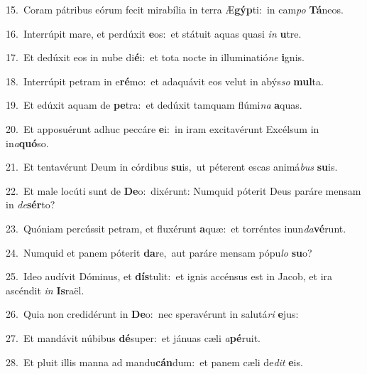 {\numbfont\textcolor{\numbcolor}{15.}}~Coram pátribus eórum fecit mirabília in terra Æ\-\textbf{gýp}\-ti:~\star in cam\textit{po} \textbf{Tá}\-neos.\par
{\numbfont\textcolor{\numbcolor}{16.}}~Interrúpit mare, et perdúxit \textbf{e}\-os:~\star et státuit aquas quasi \textit{in} \textbf{u}\-tre.\par
{\numbfont\textcolor{\numbcolor}{17.}}~Et dedúxit eos in nube di\-\textbf{é}\-i:~\star et tota nocte in illuminatió\textit{ne} \textbf{i}\-gnis.\par
{\numbfont\textcolor{\numbcolor}{18.}}~Interrúpit petram in e\-\textbf{ré}\-mo:~\star et adaquávit eos velut in abýs\textit{so} \textbf{mul}\-ta.\par
{\numbfont\textcolor{\numbcolor}{19.}}~Et edúxit aquam de \textbf{pe}\-tra:~\star et dedúxit tamquam flúmi\textit{na} \textbf{a}\-quas.\par
{\numbfont\textcolor{\numbcolor}{20.}}~Et apposuérunt adhuc peccáre \textbf{e}\-i:~\star in iram excitavérunt Excélsum in in\-\textit{a}\-\textbf{quó}so.\par
{\numbfont\textcolor{\numbcolor}{21.}}~Et tentavérunt Deum in córdibus \textbf{su}\-is,~\star ut péterent escas animá\textit{bus} \textbf{su}\-is.\par
{\numbfont\textcolor{\numbcolor}{22.}}~Et male locúti sunt de \textbf{De}\-o:~\star dixérunt: Numquid póterit Deus paráre mensam in \textit{de}\-\textbf{sér}to?\par
{\numbfont\textcolor{\numbcolor}{23.}}~Quóniam percússit petram, et fluxérunt \textbf{a}\-quæ:~\star et torréntes inun\-\textit{da}\-\textbf{vé}runt.\par
{\numbfont\textcolor{\numbcolor}{24.}}~Numquid et panem póterit \textbf{da}\-re,~\star aut paráre mensam pópu\textit{lo} \textbf{su}\-o?\par
{\numbfont\textcolor{\numbcolor}{25.}}~Ideo audívit Dóminus, et \textbf{dís}\-tulit:~\star et ignis accénsus est in Jacob, et ira ascéndit \textit{in} \textbf{Is}\-raël.\par
{\numbfont\textcolor{\numbcolor}{26.}}~Quia non credidérunt in \textbf{De}\-o:~\star nec speravérunt in salutá\textit{ri} \textbf{e}\-jus:\par
{\numbfont\textcolor{\numbcolor}{27.}}~Et mandávit núbibus \textbf{dé}\-super:~\star et jánuas cæli \textit{a}\-\textbf{pé}ruit.\par
{\numbfont\textcolor{\numbcolor}{28.}}~Et pluit illis manna ad mandu\-\textbf{cán}\-dum:~\star et panem cæli de\textit{dit} \textbf{e}\-is.\par
